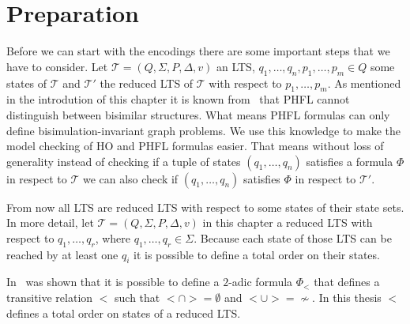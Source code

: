 \section{Preparation}\label{sec:lower_bounds_preparation}

Before we can start with the encodings there are some important steps that we have to consider.  Let $\mathcal{T} = (Q, 
\Sigma, P, \Delta, v)$ an LTS, $q_1, \dots, q_n, p_1, \dots, p_m \in Q$ some states of $\mathcal{T}$ and $\mathcal{T}'$ the 
reduced LTS of $\mathcal{T}$ with respect to $p_1, \dots, p_m$.  
As mentioned in the introdution of this chapter it is known from~\cite{lange2014capturing} that PHFL cannot distinguish 
between bisimilar structures. What means PHFL formulas can only define bisimulation-invariant graph problems. We use this 
knowledge to make the model checking of HO and PHFL formulas easier. That means without loss of generality instead of checking if a tuple of states 
$(q_1, \dots, q_n)$ satisfies a formula $\Phi$ in respect to $\mathcal{T}$ we can also check if $(q_1, \dots, q_n)$ satisfies 
$\Phi$ in respect to $\mathcal{T}'$. 

From now all LTS are reduced LTS with respect to some states of their state sets. In more detail, let $\mathcal{T} = (Q, \Sigma, P, \Delta, v)$ in this chapter a reduced LTS with respect to $q_1, \dots, q_r$, where $q_1, \dots, q_r \in \Sigma$. Because each state of those LTS can be reached by at least one $q_i$ it is possible to define a total order on their states. 

\begin{remark} \label{remark:transitive_relation}
    In~\cite{otto1999bisimulation} was shown that it is possible to define a $2$-adic formula $\Phi_<$ that defines a
    transitive relation $<$ such that $< \cap > = \emptyset$ and $< \cup > = \not\sim$. In this thesis $<$ defines a total
    order on states of a reduced LTS.
\end{remark}